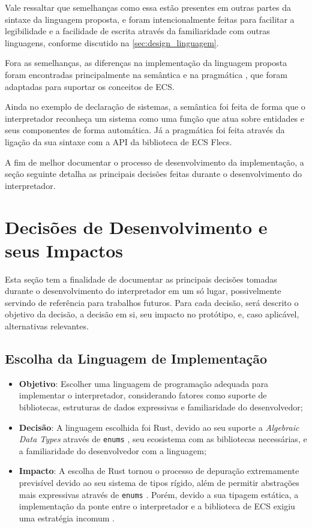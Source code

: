 Vale ressaltar que semelhanças como essa estão presentes em outras partes da sintaxe da linguagem proposta, e foram intencionalmente feitas para facilitar a legibilidade e a facilidade de escrita através da familiaridade com outras linguagens, conforme discutido na \autoref{sec:design_linguagem}.

Fora as semelhanças, as diferenças na implementação da linguagem proposta foram encontradas principalmente na semântica e na pragmática \cite{designconceptsinlanguages}, que foram adaptadas para suportar os conceitos de ECS.

Ainda no exemplo de declaração de sistemas, a semântica foi feita de forma que o interpretador reconheça um sistema como uma função que atua sobre entidades e seus componentes de forma automática. Já a pragmática foi feita através da ligação da sua sintaxe com a API da biblioteca de ECS Flecs.

A fim de melhor documentar o processo de desenvolvimento da implementação, a seção seguinte detalha as principais decisões feitas durante o desenvolvimento do interpretador.

\section{Decisões de Desenvolvimento e seus Impactos}

Esta seção tem a finalidade de documentar as principais decisões tomadas durante o desenvolvimento do interpretador em um só lugar, possivelmente servindo de referência para trabalhos futuros. Para cada decisão, será descrito o objetivo da decisão, a decisão em si, seu impacto no protótipo, e, caso aplicável, alternativas relevantes.

\subsection{Escolha da Linguagem de Implementação}

\begin{itemize}
	\item \textbf{Objetivo}: Escolher uma linguagem de programação adequada para implementar o interpretador, considerando fatores como suporte de bibliotecas, estruturas de dados expressivas e familiaridade do desenvolvedor;
	\item \textbf{Decisão}: A linguagem escolhida foi Rust, devido ao seu suporte a \textit{Algebraic Data Types} através de \texttt{enums} \cite{rustbook}, seu ecosistema com as bibliotecas necessárias, e a familiaridade do desenvolvedor com a linguagem;
	\item \textbf{Impacto}: A escolha de Rust tornou o processo de depuração extremamente previsível devido ao seu sistema de tipos rígido, além de permitir abstrações mais expressivas através de \texttt{enums} \cite{rustbook}. Porém, devido a sua tipagem estática, a implementação da ponte entre o interpretador e a biblioteca de ECS exigiu uma estratégia incomum \cite{rustbook}. %
\end{itemize}

